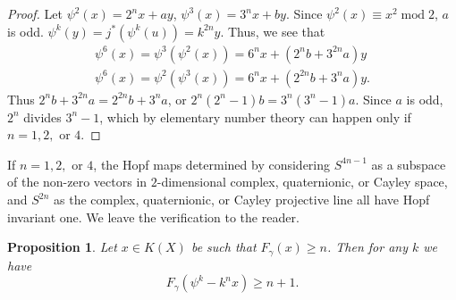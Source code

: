 \documentclass[leqno]{book}
\numberwithin{equation}{section}
\newtheorem{proposition}[theorem]{Proposition}
\theoremstyle{definition}
\begin{document}
            \begin{proof}
              Let $\psi^{2}(x)=2^{n}x+ay$, $\psi^{3}(x)=3^{n}x+by $. Since $\psi^{2}(x)\equiv x^{2}\operatorname{mod}2$, $a$ is odd. $\psi^{k}(y)=j^{*}(\psi^{k}(u))=k^{2n}y$. Thus, we see that
              \begin{equation*}
                \begin{aligned}
                \psi^{6}(x)=\psi^{3}(\psi^{2}(x))=6^{n}x+(2^{n}b+3^{2n}a)y \\
                \psi^{6}(x)=\psi^{2}(\psi^{3}(x))=6^{n}x+(2^{2n}b+3^{n}a)y.
                \end{aligned}
              \end{equation*}
              Thus $2^{n}b+3^{2n}a=2^{2n}b+3^{n}a$, or $2^{n}(2^{n}-1)b=3^{n}(3^{n}-1)a$. Since $a$ is odd, $2^{n}$ divides $3^{n}-1$, which by elementary number theory can happen only if $n=1,2,$ or $4$.
            \end{proof}

            If $n=1,2,$ or $4$, the Hopf maps determined by considering $S^{4n-1}$ as a subspace of the non-zero vectors in $2$-dimensional complex, quaternionic, or Cayley space, and $S^{2n}$ as the complex, quaternionic, or Cayley projective line all have Hopf invariant one. We leave the verification to the reader.

            \begin{proposition}
              Let $x\in K(X)$ be such that $F_{\gamma}(x)\ge n$. Then for any $k$ we have
              \begin{equation*}
                F_{\gamma}(\psi^{k}-k^{n}x)\ge n+1.
              \end{equation*}
            \end{proposition}
\end{document}
